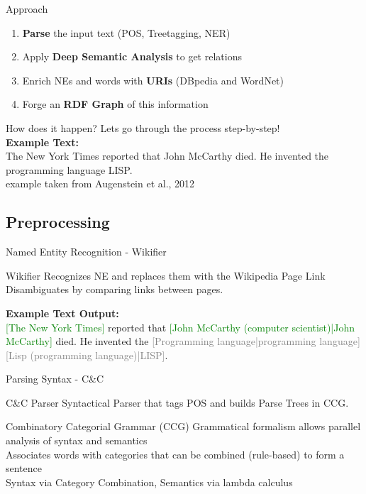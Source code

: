 \documentclass[11pt]{beamer}
\begin{document}
		\begin{frame}{Approach}
			\begin{enumerate}
				\item \textbf{Parse} the input text (POS, Treetagging, NER)
				\item Apply \textbf{Deep Semantic Analysis} to get relations
				\item Enrich NEs and words with \textbf{URIs} (DBpedia and WordNet)
				\item Forge an \textbf{RDF Graph} of this information
			\end{enumerate}					
		\end{frame}
		
		\begin{frame}{How does it happen?}
			Lets go through the process step-by-step!\\
			\vspace{15pt}
			\textbf{Example Text:}\\
			The New York Times reported that John McCarthy died. He invented the programming language LISP.\\
			\tiny{example taken from Augenstein et al., 2012}			
		\end{frame}
	\subsection{Preprocessing}
		\begin{frame}{Named Entity Recognition - Wikifier}
			\begin{block}{Wikifier}
				Recognizes NE and replaces them with the Wikipedia Page Link\\
				Disambiguates by comparing links between pages.
			\end{block}
			\vspace{15pt}
			\textbf{Example Text Output:}\\
			\textcolor{green}{[The New York Times]} reported that \textcolor{green}{[John McCarthy (computer scientist)|John McCarthy]} died. He invented the \textcolor{gray}{[Programming language|programming language]} \textcolor{gray}{[Lisp (programming language)|LISP]}.
		\end{frame}
		
		\begin{frame}{Parsing Syntax - C\&C}
			\begin{block}{C\&C Parser}
				Syntactical Parser that tags POS and builds Parse Trees in CCG.
			\end{block}
			
			\begin{block}{Combinatory Categorial Grammar (CCG)}
				Grammatical formalism allows parallel analysis of syntax and semantics\\
				Associates words with categories that can be combined (rule-based) to form a sentence\\
				Syntax via Category Combination, Semantics via lambda calculus
			\end{block}
		\end{frame}
		
\end{document}
